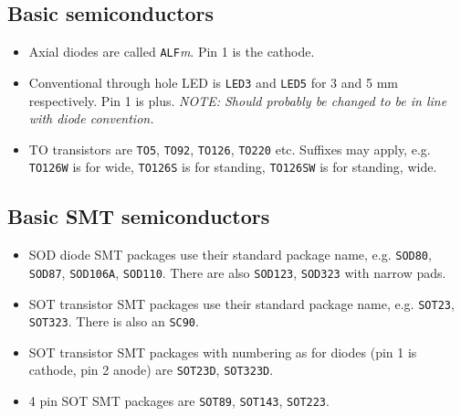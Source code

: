 \documentclass{article}
\begin{document}
\subsection{Basic semiconductors}
\begin{itemize}
\item   Axial diodes are called {\tt ALF}{\it m}. Pin 1 is the cathode.

\item   Conventional through hole LED is {\tt LED3} and {\tt LED5}
	for 3 and 5 mm respectively. Pin 1 is plus. 
	{\it NOTE: Should probably be changed to be in line with diode
	convention.}

\item   TO transistors are {\tt TO5}, {\tt TO92}, {\tt TO126}, 
	{\tt TO220} etc. Suffixes may apply, e.g. {\tt TO126W} is for 
	wide, {\tt TO126S} is for standing, {\tt TO126SW} is for standing,
	wide.
\end{itemize}

\subsection{Basic SMT semiconductors}
\begin{itemize}
\item   SOD diode SMT packages use their standard package name, e.g.
	{\tt SOD80}, {\tt SOD87}, {\tt SOD106A}, {\tt SOD110}. There are 
	also {\tt SOD123}, {\tt SOD323} with narrow pads.

\item   SOT transistor SMT packages use their standard package name,
	e.g. {\tt SOT23}, {\tt SOT323}. There is also an {\tt SC90}.

\item   SOT transistor SMT packages with numbering as for diodes (pin 1
	is cathode, pin 2 anode) are {\tt SOT23D}, {\tt SOT323D}.

\item   4 pin SOT SMT packages are {\tt SOT89}, {\tt SOT143}, {\tt SOT223}.
\end{itemize}
\end{document}
